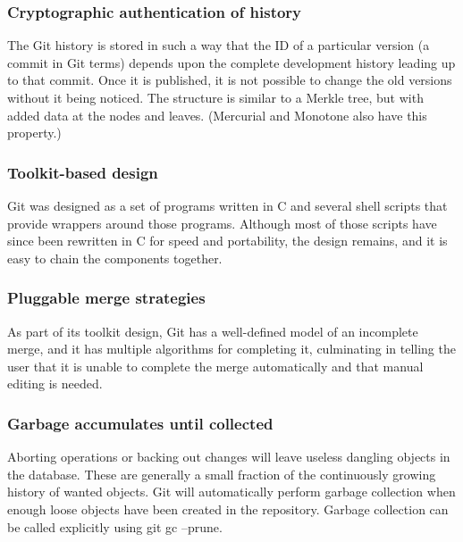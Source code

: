 \documentclass[a4paper]{report}
\begin{document}
\subsubsection{Cryptographic authentication of history}
The Git history is stored in such a way that the ID of a particular version (a commit in Git terms) depends upon the complete development history leading up to that commit. Once it is published, it is not possible to change the old versions without it being noticed. The structure is similar to a Merkle tree, but with added data at the nodes and leaves. (Mercurial and Monotone also have this property.)
\subsubsection{Toolkit-based design}
Git was designed as a set of programs written in C and several shell scripts that provide wrappers around those programs. Although most of those scripts have since been rewritten in C for speed and portability, the design remains, and it is easy to chain the components together.
\subsubsection{Pluggable merge strategies}
As part of its toolkit design, Git has a well-defined model of an incomplete merge, and it has multiple algorithms for completing it, culminating in telling the user that it is unable to complete the merge automatically and that manual editing is needed.
\subsubsection{Garbage accumulates until collected}
Aborting operations or backing out changes will leave useless dangling objects in the database. These are generally a small fraction of the continuously growing history of wanted objects. Git will automatically perform garbage collection when enough loose objects have been created in the repository. Garbage collection can be called explicitly using git gc --prune.
\end{document}
